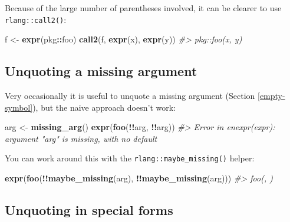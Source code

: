\documentclass[]{book}
\newenvironment{Shaded}{\begin{snugshade}}{\end{snugshade}}
\newcommand{\CommentTok}[1]{\textcolor[rgb]{0.37,0.37,0.37}{\textit{#1}}}
\newcommand{\KeywordTok}[1]{\textcolor[rgb]{0.27,0.27,0.27}{\textbf{#1}}}
\newcommand{\NormalTok}[1]{#1}
\newcommand{\OperatorTok}[1]{\textcolor[rgb]{0.43,0.43,0.43}{\textbf{#1}}}
\newcommand{\StringTok}[1]{\textcolor[rgb]{0.5,0.5,0.5}{#1}}
\begin{document}
Because of the large number of parentheses involved, it can be clearer to use \texttt{rlang::call2()}:

\begin{Shaded}
\begin{Highlighting}[]
\NormalTok{f <-}\StringTok{ }\KeywordTok{expr}\NormalTok{(pkg}\OperatorTok{::}\NormalTok{foo)}
\KeywordTok{call2}\NormalTok{(f, }\KeywordTok{expr}\NormalTok{(x), }\KeywordTok{expr}\NormalTok{(y))}
\CommentTok{#> pkg::foo(x, y)}
\end{Highlighting}
\end{Shaded}

\hypertarget{unquote-missing}{%
\subsection{Unquoting a missing argument}\label{unquote-missing}}


Very occasionally it is useful to unquote a missing argument (Section \ref{empty-symbol}), but the naive approach doesn't work:

\begin{Shaded}
\begin{Highlighting}[]
\NormalTok{arg <-}\StringTok{ }\KeywordTok{missing_arg}\NormalTok{()}
\KeywordTok{expr}\NormalTok{(}\KeywordTok{foo}\NormalTok{(}\OperatorTok{!!}\NormalTok{arg, }\OperatorTok{!!}\NormalTok{arg))}
\CommentTok{#> Error in enexpr(expr): argument "arg" is missing, with no default}
\end{Highlighting}
\end{Shaded}

You can work around this with the \texttt{rlang::maybe\_missing()} helper:

\begin{Shaded}
\begin{Highlighting}[]
\KeywordTok{expr}\NormalTok{(}\KeywordTok{foo}\NormalTok{(}\OperatorTok{!!}\KeywordTok{maybe_missing}\NormalTok{(arg), }\OperatorTok{!!}\KeywordTok{maybe_missing}\NormalTok{(arg)))}
\CommentTok{#> foo(, )}
\end{Highlighting}
\end{Shaded}

\hypertarget{unquoting-in-special-forms}{%
\subsection{Unquoting in special forms}\label{unquoting-in-special-forms}}
\end{document}

